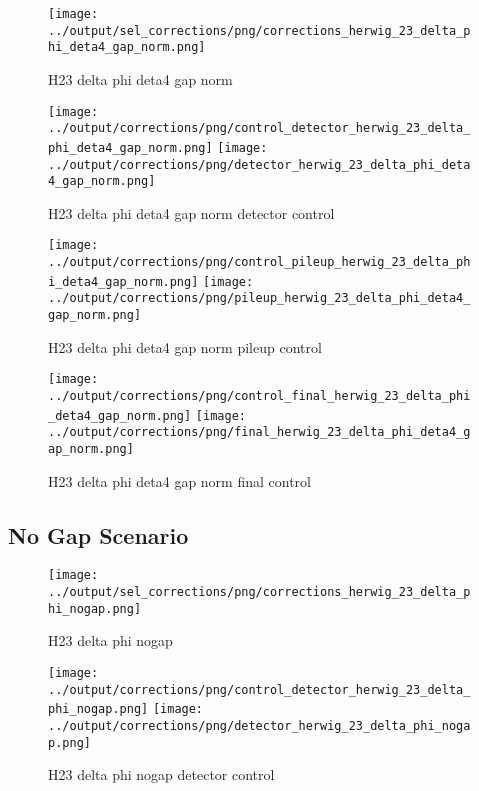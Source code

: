 \documentclass[11pt]{book}
\begin{document}
\begin{figure}[ht]
\centering
\texttt{[image: ../output/sel\_corrections/png/corrections\_herwig\_23\_delta\_phi\_deta4\_gap\_norm.png]}
\caption{H23 delta phi deta4 gap norm}
\label{fig:H23_delta_phi_deta4_gap_norm}
\end{figure}


\begin{figure}[ht]
\centering
\texttt{[image: ../output/corrections/png/control\_detector\_herwig\_23\_delta\_phi\_deta4\_gap\_norm.png]}
\texttt{[image: ../output/corrections/png/detector\_herwig\_23\_delta\_phi\_deta4\_gap\_norm.png]}
\caption{H23 delta phi deta4 gap norm detector control}
\label{fig:H23_delta_phi_deta4_gap_norm_detector_control}
\end{figure}

\begin{figure}[ht]
\centering
\texttt{[image: ../output/corrections/png/control\_pileup\_herwig\_23\_delta\_phi\_deta4\_gap\_norm.png]}
\texttt{[image: ../output/corrections/png/pileup\_herwig\_23\_delta\_phi\_deta4\_gap\_norm.png]}
\caption{H23 delta phi deta4 gap norm pileup control}
\label{fig:H23_delta_phi_deta4_gap_norm_pileup_control}
\end{figure}


\begin{figure}[ht]
\centering
\texttt{[image: ../output/corrections/png/control\_final\_herwig\_23\_delta\_phi\_deta4\_gap\_norm.png]}
\texttt{[image: ../output/corrections/png/final\_herwig\_23\_delta\_phi\_deta4\_gap\_norm.png]}
\caption{H23 delta phi deta4 gap norm final control}
\label{fig:H23_delta_phi_deta4_gap_norm_final_control}
\end{figure}


\clearpage
\subsection{No Gap Scenario}
\begin{figure}[ht]
\centering
\texttt{[image: ../output/sel\_corrections/png/corrections\_herwig\_23\_delta\_phi\_nogap.png]}
\caption{H23 delta phi nogap}
\label{fig:H23_delta_phi_nogap}
\end{figure}

\begin{figure}[ht]
\centering
\texttt{[image: ../output/corrections/png/control\_detector\_herwig\_23\_delta\_phi\_nogap.png]}
\texttt{[image: ../output/corrections/png/detector\_herwig\_23\_delta\_phi\_nogap.png]}
\caption{H23 delta phi nogap detector control}
\label{fig:H23_delta_phi_nogap_detector_control}
\end{figure}
\end{document}
